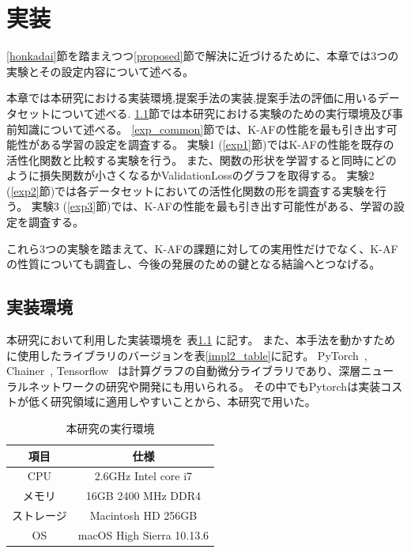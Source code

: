 \chapter{実装}
\label{implementation}

\ref{honkadai}節を踏まえつつ\ref{proposed}節で解決に近づけるために、本章では3つの実験とその設定内容について述べる。

本章では本研究における実装環境,提案手法の実装,提案手法の評価に用いるデータセットについて述べる.
\ref{impl_env}節では本研究における実験のための実行環境及び事前知識について述べる。
\ref{exp_common}節では、K-AFの性能を最も引き出す可能性がある学習の設定を調査する。
実験1 (\ref{exp1}節)ではK-AFの性能を既存の活性化関数と比較する実験を行う。
また、関数の形状を学習すると同時にどのように損失関数が小さくなるかValidationLossのグラフを取得する。
実験2 (\ref{exp2}節)では各データセットにおいての活性化関数の形を調査する実験を行う。
実験3 (\ref{exp3}節)では、K-AFの性能を最も引き出す可能性がある、学習の設定を調査する。

これら3つの実験を踏まえて、K-AFの課題に対しての実用性だけでなく、K-AFの性質についても調査し、今後の発展のための鍵となる結論へとつなげる。



\section{実装環境}
\label{impl_env}



本研究において利用した実装環境を 表\ref{impl_table} に記す。
また、本手法を動かすために使用したライブラリのバージョンを表\ref{impl2_table}に記す。
PyTorch~\cite{pytorch}, Chainer~\cite{chainer},  Tensorflow~\cite{tensorflow} は計算グラフの自動微分ライブラリであり、深層ニューラルネットワークの研究や開発にも用いられる。
その中でもPytorchは実装コストが低く研究領域に適用しやすいことから、本研究で用いた。


\begin{table}[htbp]
    \begin{center}
        \caption{本研究の実行環境}
        \label{impl_table}
        \begin{tabular}{|c|c|}
        \hline
        項目              & 仕様 \\
        \hline
        CPU               &  2.6GHz Intel core i7 \\
        \hline
        メモリ             & 16GB 2400 MHz DDR4 \\
        \hline
        ストレージ          & Macintosh HD 256GB \\
        \hline
        OS               & macOS High Sierra 10.13.6 \\
        \hline
        \end{tabular}
    \end{center}
\end{table}


